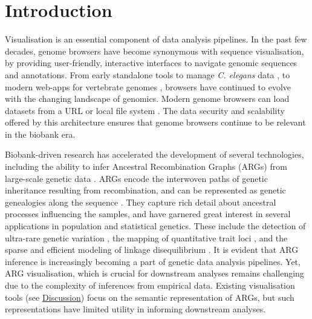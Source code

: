 \documentclass[unnumsec,webpdf,contemporary,large,namedate]{oup-authoring-template}%
\begin{document}
\maketitle
\section{Introduction}
Visualisation is an essential component of data analysis pipelines. In the past few decades, genome browsers have become synonymous with sequence visualisation, by providing user-friendly, interactive interfaces to navigate genomic sequences and annotations. From early standalone tools to manage \textit{C. elegans} data \citep{Eeckman1995}, to modern web-apps for vertebrate genomes \citep{Birney2004,Rangwala2024,Nassar2023}, browsers have continued to evolve with the changing landscape of genomics. Modern genome browsers can load datasets from a URL or local file system \citep{IGV-web,Lee2013,Robinson2023}. The data security and scalability offered by this architecture ensures that genome browsers continue to be relevant in the biobank era.

Biobank-driven research has accelerated the development of several technologies, including the ability to infer Ancestral Recombination Graphs (ARGs) from large-scale genetic data \citep{Kelleher2019,Speidel2019,Zhang2023,Gunnarsson2024.08.31.610248,Deng2024.03.16.585351}. ARGs encode the interwoven paths of genetic inheritance resulting from recombination, and can be represented as genetic genealogies along the sequence \citep{Wong2024,Hudson1983,Griffiths1997}. They capture rich detail about ancestral processes influencing the samples, and have garnered great interest in several applications in population and statistical genetics. These include the detection of ultra-rare genetic variation \citep{Zhang2023}, the mapping of quantitative trait loci \citep{Link2023}, and the sparse and efficient modeling of linkage disequilibrium \citep{Nowbandegani2023}. 
It is evident that ARG inference is increasingly becoming a part of genetic data analysis pipelines. Yet, ARG visualisation, which is crucial for downstream analyses remains challenging due to the complexity of inferences from empirical data. Existing visualisation tools (see \hyperref[sec:Discussion]{Discussion}) focus on the semantic representation of ARGs, but such representations have limited utility in informing downstream analyses. 
\end{document}
